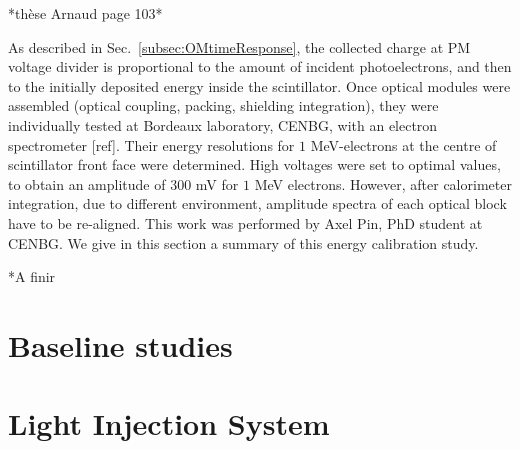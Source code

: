 *thèse Arnaud page 103*

As described in Sec.~\ref{subsec:OMtimeResponse}, the collected charge at PM voltage divider is proportional to the amount of incident photoelectrons, and then to the initially deposited energy inside the scintillator.
Once optical modules were assembled (optical coupling, packing, shielding integration), they were individually tested at Bordeaux laboratory, CENBG, with an electron spectrometer [ref].
Their energy resolutions for $1$ MeV-electrons at the centre of scintillator front face were determined.
High voltages were set to optimal values, to obtain an amplitude of $300$ mV for $1$ MeV electrons.
However, after calorimeter integration, due to different environment, amplitude spectra of each optical block have to be re-aligned.
This work was performed by Axel Pin, PhD student at CENBG.
We give in this section a summary of this energy calibration study.

*A finir\\




\section{Baseline studies}
\label{sec:comm_baseline}

\section{Light Injection System}
\label{sec:LI}
